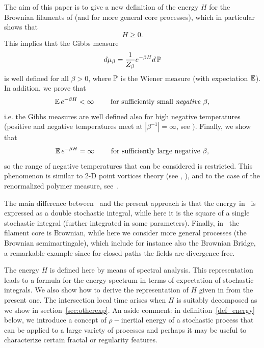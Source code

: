 The aim of this paper is to give a new definition of the energy $H$ for the
Brownian filaments of \cite{Fl2} (and for more general core processes),
which in particular shows that 
\begin{equation*}
H\geq 0.
\end{equation*}
This implies that the Gibbs measure 
\begin{equation*}
d\mu _{\beta }=\frac{1}{Z_{\beta }}e^{-\beta H}d\operatorname{{\mathbb P}}
\end{equation*}
is well defined for all $\beta >0$, where $\operatorname{{\mathbb P}}$ is the Wiener measure (with
expectation $\operatorname{{\mathbb E}}$). In
addition, we prove that 
\begin{equation*}
\operatorname{{\mathbb E}} e^{-\beta H}  <\infty \qquad \text{\ for sufficiently small 
\textit{negative} }\beta ,
\end{equation*}
i.e. the Gibbs measures are well defined also for high negative temperatures
(positive and negative temperatures meet at $|\beta^{-1}|=\infty $, see \cite{Ch}).
Finally, we show that 
\begin{equation*}
\operatorname{{\mathbb E}}  e^{-\beta H}  =\infty \qquad \text{\ for sufficiently large
negative }\beta ,
\end{equation*}
so the range of negative temperatures that can be considered is restricted.
This phenomenon is similar to 2-D point vortices theory (see \cite{Ch}, \cite
{Mar-Pulv}), and to the case of the renormalized polymer measure, see~\cite{LeG3}.

The main difference between~\cite{Fl2} and the
present approach is that the energy in~\cite{Fl2} is expressed as a double
stochastic integral, while here it is the square of a single stochastic
integral (further integrated in some parameters). Finally, in~\cite{Fl2} the
filament core is Brownian, while here we consider more general processes
(the Brownian semimartingale), which include for instance also the Brownian
Bridge, a remarkable example since for closed paths the fields are
divergence free.

The energy $H$ is defined here by means of spectral analysis. This
representation leads to a formula for the energy spectrum in terms of
expectation of stochastic integrals. We also show how to derive the
representation of $H$ given in  \cite{Fl2} from the present one. The
intersection local time arises when $H$ is suitably decomposed as we
show in section~\ref{sec:otherexp}.
An aside comment: in definition~\ref{def_energy} below, we introduce a concept of
$\rho-$inertial energy of a stochastic process that can be applied to
a large variety of processes and perhaps it may be useful to
characterize certain fractal or regularity features.

